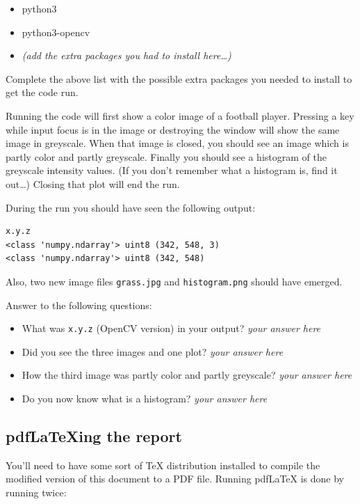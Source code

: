 \documentclass{article}
\begin{document}
\begin{itemize}
\item python3
\item python3-opencv
\item \emph{(add the extra packages you had to install here\ldots)}
\end{itemize}

Complete the above list with the possible extra packages you needed
to install to get the code run.

Running the code will first show a color image of a football player.
Pressing a key while input focus is in the image or destroying the
window will show the same image in greyscale.  When that image is
closed, you should see an image which is partly color and partly
greyscale.  Finally you should see a histogram of the greyscale
intensity values.  (If you don't remember what a histogram is, find it
out\ldots) Closing that plot will end the run.

During the run you should have seen the following output:

\begin{verbatim}
x.y.z
<class 'numpy.ndarray'> uint8 (342, 548, 3)
<class 'numpy.ndarray'> uint8 (342, 548)
\end{verbatim}

Also, two new image files \texttt{grass.jpg} and
\texttt{histogram.png} should have emerged.

Answer to the following questions:

\begin{itemize}
\item What was \texttt{x.y.z} (OpenCV version) in your output? \emph{your answer here} 
\item Did you see the three images and one plot? \emph{your answer here} 
\item How the third image was partly color and partly greyscale? \emph{your answer here} 
\item Do you now know what is a histogram? \emph{your answer here} 
\end{itemize}


\subsection{pdf\LaTeX{}ing the report}

You'll need to have some sort of \TeX{} distribution installed to
compile the modified version of this document to a PDF file.  Running
pdf\LaTeX{} is done by running twice:
\end{document}
